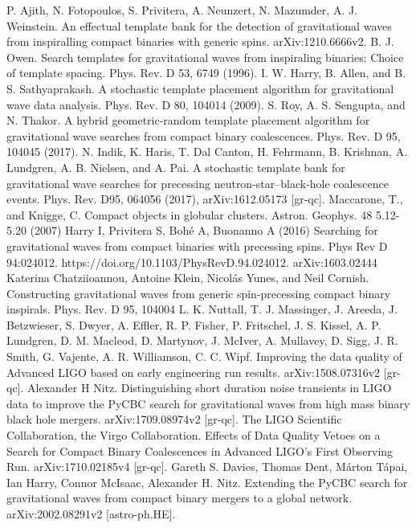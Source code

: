 \documentclass[binding=0.6cm, LaM]{sapthesis}
\begin{document}
\begin{thebibliography}{500}
	 P. Ajith, N. Fotopoulos, S. Privitera, A. Neunzert, N. Mazumder, A. J. Weinstein. An effectual template bank for the detection of gravitational waves from inspiralling compact binaries with generic spins. arXiv:1210.6666v2.
	 B. J. Owen. Search templates for gravitational waves from inspiraling binaries: Choice of template spacing. Phys. Rev. D 53, 6749 (1996). 
	 I. W. Harry, B. Allen, and B. S. Sathyaprakash. A stochastic template placement algorithm for gravitational wave data analysis. Phys. Rev. D 80, 104014 (2009).  
	 S. Roy, A. S. Sengupta, and N. Thakor. A hybrid geometric-random template placement algorithm for gravitational wave searches from compact binary coalescences. Phys. Rev. D 95, 104045 (2017). 
	 N. Indik, K. Haris, T. Dal Canton, H. Fehrmann, B. Krishnan, A. Lundgren, A. B. Nielsen, and A. Pai. A stochastic template bank for gravitational wave searches for precessing neutron-star--black-hole coalescence events. Phys. Rev. D95, 064056 (2017), arXiv:1612.05173 [gr-qc].  
	 Maccarone, T., and Knigge, C. Compact objects in globular clusters. Astron. Geophys. 48 5.12- 5.20 (2007)
	 Harry I, Privitera S, Bohé A, Buonanno A (2016) Searching for gravitational waves from compact binaries with precessing spins. Phys Rev D 94:024012. https://doi.org/10.1103/PhysRevD.94.024012. arXiv:1603.02444
	 Katerina Chatziioannou, Antoine Klein, Nicolás Yunes, and Neil Cornish. Constructing gravitational waves from generic spin-precessing compact binary inspirals. Phys. Rev. D 95, 104004
	 L. K. Nuttall, T. J. Massinger, J. Areeda, J. Betzwieser, S. Dwyer, A. Effler, R. P. Fisher, P. Fritschel, J. S. Kissel, A. P. Lundgren, D. M. Macleod, D. Martynov, J. McIver, A. Mullavey, D. Sigg, J. R. Smith, G. Vajente, A. R. Williamson, C. C. Wipf. Improving the data quality of Advanced LIGO based on early engineering run results. arXiv:1508.07316v2 [gr-qc].
	 Alexander H Nitz. Distinguishing short duration noise transients in LIGO data to improve the PyCBC search for gravitational waves from high mass binary black hole mergers. arXiv:1709.08974v2 [gr-qc].
	 The LIGO Scientific Collaboration, the Virgo Collaboration. Effects of Data Quality Vetoes on a Search for Compact Binary Coalescences in Advanced LIGO's First Observing Run. arXiv:1710.02185v4 [gr-qc].
	 Gareth S. Davies, Thomas Dent, Márton Tápai, Ian Harry, Connor McIsaac, Alexander H. Nitz. Extending the PyCBC search for gravitational waves from compact binary mergers to a global network. arXiv:2002.08291v2 [astro-ph.HE].

\end{thebibliography}
\end{document}
